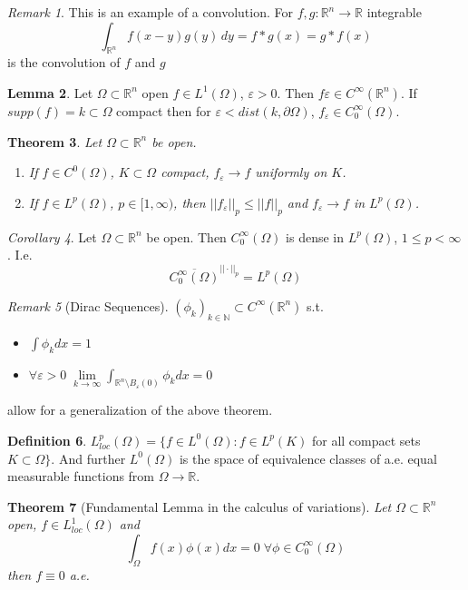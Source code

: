 \documentclass[a4paper, 12pt]{article}
\theoremstyle{plain}
\newtheorem{theorem}{Theorem}[subsection] %
\theoremstyle{definition}
\newtheorem{definition}[theorem]{Definition} %
\theoremstyle{lemma}
\newtheorem{lemma}[theorem]{Lemma}
\theoremstyle{remark}
\newtheorem{remark}[theorem]{Remark}
\theoremstyle{corollary}
\newtheorem{corollary}[theorem]{Corollary}
\theoremstyle{example}
\begin{document}
	\begin{remark}
		This is an example of a convolution. For $f,g:\mathbb{R}^n \to \mathbb{R}$ integrable \[\int_{\mathbb{R}^n} f(x-y)g(y)\,dy = f*g(x) = g*f(x)\] is the convolution of $f$ and $g$
	\end{remark}
	\begin{lemma}
		Let $\Omega \subset \mathbb{R}^n$ open $f \in L^1(\Omega)$, $\varepsilon>0$. Then $f\varepsilon \in C^\infty(\mathbb{R}^n)$. If $supp(f) = k\subset\Omega$ compact then for $\varepsilon < dist(k,\partial \Omega)$, $f_\varepsilon \in C_0^\infty(\Omega)$.
	\end{lemma}
	\begin{theorem}
		Let $\Omega \subset \mathbb{R}^n$ be open. \begin{enumerate}
			\item If $f \in C^0(\Omega)$, $K\subset \Omega$ compact, $f_\varepsilon \to f$ uniformly on $K$.
			\item If $f \in L^p(\Omega)$, $p\in [1,\infty)$, then $||f_\varepsilon||_p \leq ||f||_p$ and $f_\varepsilon \to f$ in $L^p(\Omega)$.
		\end{enumerate}
	\end{theorem}
	\begin{corollary}
		Let $\Omega \subset \mathbb{R}^n$ be open. Then $C^\infty_0(\Omega)$ is dense in $L^p(\Omega)$, $1\leq p < \infty$. I.e. \[\overline{C_0^\infty(\Omega)}^{||\cdot||_p} = L^p(\Omega)\] 
	\end{corollary}
	\begin{remark}[Dirac Sequences]
		$(\phi_k)_{k\in \mathbb{N}} \subset C^\infty(\mathbb{R}^n)$ s.t. \begin{itemize}
			\item $\int \phi_k dx = 1$
			\item $\forall \varepsilon>0 \; \lim\limits_{k \to \infty} \int_{\mathbb{R}^n\setminus B_\varepsilon(0)} \phi_k dx = 0$ 
		\end{itemize}
		allow for a generalization of the above theorem.
	\end{remark}
	\begin{definition}
		$L^p_{loc}(\Omega) = \{f \in L^0(\Omega) : f \in L^p(K)$ for all compact sets $K\subset \Omega\}$. And further $L^0(\Omega)$ is the space of equivalence classes of a.e. equal measurable functions from $\Omega \to \mathbb{R}$.
	\end{definition}
	\begin{theorem}[Fundamental Lemma in the calculus of variations]
		Let $\Omega \subset \mathbb{R}^n$ open, $f\in L_{loc}^1(\Omega)$ and \[\int_\Omega f(x)\phi(x)dx = 0 \; \forall \phi \in C_0^\infty(\Omega)\] then $f \equiv 0$ a.e.
	\end{theorem}
\end{document}
